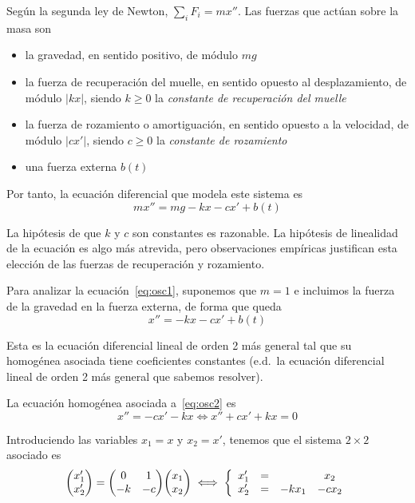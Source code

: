 \documentclass[../ecuaciones_diferenciales.tex]{subfiles}
\begin{document}
Según la segunda ley de Newton, \(\sum_i F_i = mx''\). Las fuerzas que actúan sobre
la masa son

\begin{itemize}
	\item la gravedad, en sentido positivo, de módulo \(mg\)
	\item la fuerza de recuperación del muelle, en sentido opuesto al
	      desplazamiento, de módulo \(|kx|\), siendo \(k \geq 0\) la \emph{constante de
		      recuperación del muelle}
	\item la fuerza de rozamiento o amortiguación, en sentido opuesto a la
	      velocidad, de módulo \(|cx'|\), siendo \(c \geq 0\) la \emph{constante de rozamiento}
	\item una fuerza externa \(b(t)\)
\end{itemize}

Por tanto, la ecuación diferencial que modela este sistema es
\begin{equation} \label{eq:osc1}
	mx'' = mg - kx - cx' + b(t)
\end{equation}

\begin{remark}
	La hipótesis de que \(k\) y \(c\) son constantes es razonable. La hipótesis de
	linealidad de la ecuación es algo más atrevida, pero observaciones empíricas
	justifican esta elección de las fuerzas de recuperación y rozamiento.
\end{remark}

Para analizar la ecuación~\eqref{eq:osc1}, suponemos que \(m=1\) e incluimos la
fuerza de la gravedad en la fuerza externa, de forma que queda
\begin{equation} \label{eq:osc2}
	x'' = - kx - cx' + b(t)
\end{equation}

\begin{remark}
	Esta es la ecuación diferencial lineal de orden 2 más general tal que su
	homogénea asociada tiene coeficientes constantes (e.d.\ la ecuación diferencial
	lineal de orden 2 más general que sabemos resolver).
\end{remark}

La ecuación homogénea asociada a~\eqref{eq:osc2} es
\begin{equation} \label{eq:osch}
	x'' = - cx' - kx \iff x'' + cx' + kx = 0
\end{equation}

Introduciendo las variables \(x_1 = x\) y \(x_2 = x'\), tenemos que el sistema
\(2 \times 2\) asociado es
\[\mat{x_1' \\ x_2'} = \mat{0 & 1 \\ -k & -c} \mat{x_1 \\ x_2} \iff
	\left\{\begin{array}{c c c c}
		x_1' & = &       & x_2   \\
		x_2' & = & -kx_1 & -cx_2
	\end{array}\right.
\]
\end{document}
